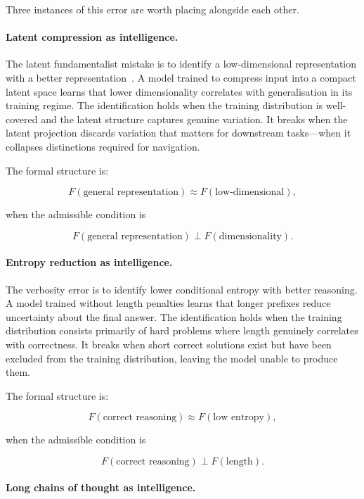 \documentclass[11pt]{article}
\theoremstyle{rthm}
\theoremstyle{rdef}
\theoremstyle{remark}
\begin{document}
Three instances of this error are worth placing alongside each other.

\paragraph{Latent compression as intelligence.}

The latent fundamentalist mistake is to identify a low-dimensional
representation with a better representation~\cite{flyxion2026latent}.
A model trained to compress input into a compact latent space learns
that lower dimensionality correlates with generalisation in its
training regime. The identification holds when the training
distribution is well-covered and the latent structure captures
genuine variation. It breaks when the latent projection discards
variation that matters for downstream tasks---when it collapses
distinctions required for navigation.

The formal structure is:

\[
F(\text{general representation}) \approx F(\text{low-dimensional}),
\]

when the admissible condition is

\[
F(\text{general representation}) \perp F(\text{dimensionality}).
\]

\paragraph{Entropy reduction as intelligence.}

The verbosity error is to identify lower conditional entropy with
better reasoning. A model trained without length penalties learns
that longer prefixes reduce uncertainty about the final answer.
The identification holds when the training distribution consists
primarily of hard problems where length genuinely correlates with
correctness. It breaks when short correct solutions exist but have
been excluded from the training distribution, leaving the model
unable to produce them.

The formal structure is:

\[
F(\text{correct reasoning}) \approx F(\text{low entropy}),
\]

when the admissible condition is

\[
F(\text{correct reasoning}) \perp F(\text{length}).
\]

\paragraph{Long chains of thought as intelligence.}
\end{document}
